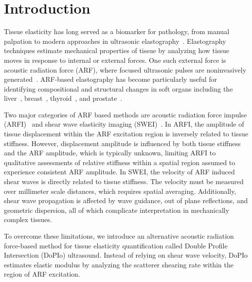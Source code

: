 \section{Introduction}
\label{sec:intro}

Tissue elasticity has long served as a biomarker for pathology, from manual palpation to modern approaches in ultrasonic elastography~\cite{nightingale_feasibility_2001}. Elastography techniques estimate mechanical properties of tissue by analyzing how tissue moves in response to internal or external forces. One such external force is acoustic radiation force (ARF), where focused ultrasonic pulses are noninvasively generated~\cite{sigrist_Ultrasound_2017,doherty_Acoustic_2013}. ARF-based elastography has become particularly useful for identifying compositional and structural changes in soft organs including the liver~\cite{frulio_Evaluation_2013, barr_Can_2020}, breast~\cite{magalhaes_Diagnostic_2017, krouskop_Elastic_1998,tsai_Sonographic_2013}, thyroid~\cite{zhang_Acoustic_2015}, and prostate~\cite{krouskop_Elastic_1998}.

Two major categories of ARF based methods are acoustic radiation force impulse (ARFI)~\cite{nightingale_feasibility_2001} and shear wave elasticity imaging (SWEI)~\cite{sarvazyan_Shear_1998}. In ARFI, the amplitude of tissue displacement within the ARF excitation region is inversely related to tissue stiffness. However, displacement amplitude is influenced by both tissue stiffness and the ARF amplitude, which is typically unknown, limiting ARFI to qualitative assessments of relative stiffness within a spatial region assumed to experience consistent ARF amplitude. In SWEI, the velocity of ARF induced shear waves is directly related to tissue stiffness. The velocity must be measured over millimeter scale distances, which requires spatial averaging. Additionally, shear wave propagation is affected by wave guidance, out of plane reflections, and geometric dispersion, all of which complicate interpretation in mechanically complex tissues.

To overcome these limitations, we introduce an alternative acoustic radiation force-based method for tissue elasticity quantification called Double Profile Intersection (DoPIo) ultrasound. Instead of relying on shear wave velocity, DoPIo estimates elastic modulus by analyzing the scatterer shearing rate within the region of ARF excitation.

